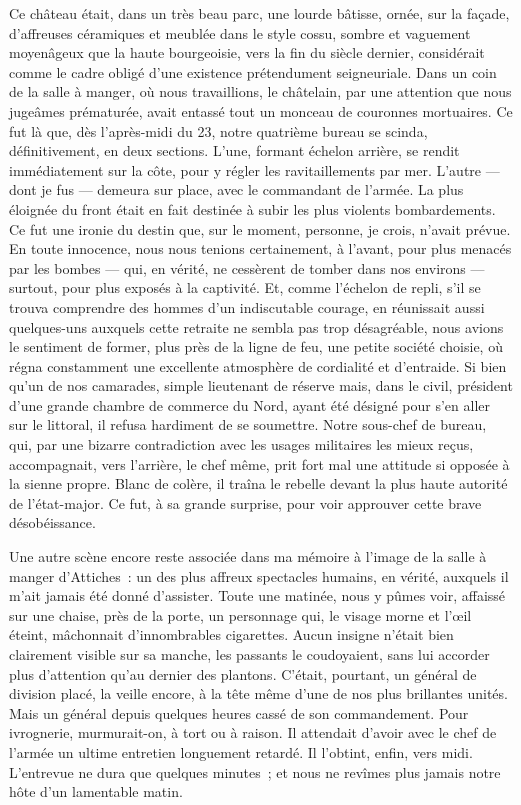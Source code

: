 \documentclass[french,twoside]{book} %
\begin{document}
Ce château était, dans un très beau parc, une lourde bâtisse, ornée, sur la façade, d’affreuses céramiques et meublée dans le style cossu, sombre et vaguement moyenâgeux que la haute bourgeoisie, vers la fin du siècle dernier, considérait comme le cadre obligé d’une existence prétendument seigneuriale. Dans un coin de la salle à manger, où nous travaillions, le châtelain, par une attention que nous jugeâmes prématurée, avait entassé tout un monceau de couronnes mortuaires. Ce fut là que, dès l’après-midi du 23, notre quatrième bureau se scinda, définitivement, en deux sections. L’une, formant   échelon arrière, se rendit immédiatement sur la côte, pour y régler les ravitaillements par mer. L’autre — dont je fus — demeura sur place, avec le commandant de l’armée. La plus éloignée du front était en fait destinée à subir les plus violents bombardements. Ce fut une ironie du destin que, sur le moment, personne, je crois, n’avait prévue. En toute innocence, nous nous tenions certainement, à l’avant, pour plus menacés par les bombes — qui, en vérité, ne cessèrent de tomber dans nos environs — surtout, pour plus exposés à la captivité. Et, comme l’échelon de repli, s’il se trouva comprendre des hommes d’un indiscutable courage, en réunissait aussi quelques-uns auxquels cette retraite ne sembla pas trop désagréable, nous avions le sentiment de former, plus près de la ligne de feu, une petite société choisie, où régna constamment une excellente atmosphère de cordialité et d’entraide. Si bien qu’un de nos camarades, simple lieutenant de réserve mais, dans le civil, président d’une grande chambre de commerce du Nord, ayant été désigné pour s’en aller sur le littoral, il refusa hardiment de se soumettre. Notre sous-chef de bureau, qui, par une bizarre contradiction avec les usages militaires les mieux reçus, accompagnait, vers l’arrière, le chef même, prit fort mal une attitude si opposée à la sienne propre. Blanc de colère, il traîna le rebelle devant la plus haute autorité de l’état-major. Ce fut, à sa grande surprise, pour voir approuver cette brave désobéissance.\par
Une autre scène encore reste associée dans ma mémoire à l’image de la salle à manger d’Attiches : un des plus affreux spectacles humains, en vérité, auxquels il m’ait jamais été donné d’assister. Toute une matinée, nous y pûmes voir, affaissé sur une chaise, près de la porte, un personnage qui, le visage morne et l’œil éteint, mâchonnait d’innombrables cigarettes. Aucun insigne n’était bien clairement visible sur sa manche, les passants le coudoyaient,   sans lui accorder plus d’attention qu’au dernier des plantons. C’était, pourtant, un général de division placé, la veille encore, à la tête même d’une de nos plus brillantes unités. Mais un général depuis quelques heures cassé de son commandement. Pour ivrognerie, murmurait-on, à tort ou à raison. Il attendait d’avoir avec le chef de l’armée un ultime entretien longuement retardé. Il l’obtint, enfin, vers midi. L’entrevue ne dura que quelques minutes ; et nous ne revîmes plus jamais notre hôte d’un lamentable matin.\par
\end{document}

